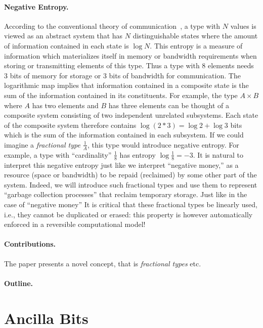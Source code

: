 \documentclass[sigplan,10pt,review,anonymous]{acmart}
\begin{document}
\paragraph*{Negative Entropy.}  
According to the conventional theory of
communication~\cite{Shannon1948}, a type with $N$ values is viewed as
an abstract system that has $N$ distinguishable states where the
amount of information contained in each state is $\log{N}$. This
entropy is a measure of information which materializes itself in
memory or bandwidth requirements when storing or transmitting elements
of this type. Thus a type with 8 elements needs 3 bits of memory for
storage or 3 bits of bandwidth for communication. The logarithmic map
implies that information contained in a composite state is the sum of
the information contained in its constituents. For example, the type
$A \times B$ where $A$ has two elements and $B$ has three elements can
be thought of a composite system consisting of two independent
unrelated subsystems.  Each state of the composite system therefore
contains $\log{(2*3)} = \log{2} + \log{3}$ bits which is the sum of
the information contained in each subsystem. If we could imagine a
\emph{fractional type} $\frac{1}{A}$, this type would introduce
negative entropy. For example, a type with ``cardinality''
$\frac{1}{8}$ has entropy $\log{\frac{1}{8}} = -3$. It is natural to
interpret this negative entropy just like we interpret ``negative
money,'' as a resource (space or bandwidth) to be repaid (reclaimed)
by some other part of the system. Indeed, we will introduce such
fractional types and use them to represent ``garbage collection
processes'' that reclaim temporary storage. Just like in the case of
``negative money'' It is critical that these fractional types be
linearly used, i.e., they cannot be duplicated or erased: this
property is however automatically enforced in a reversible
computational model!

\paragraph*{Contributions.} The paper presents a novel concept, that
is \emph{fractional types} etc.

\paragraph*{Outline.}

\section{Ancilla Bits}
\label{sec:examples}
 
\end{document}
